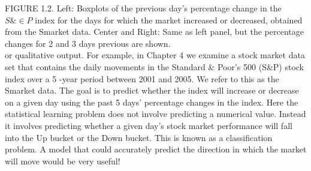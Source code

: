 \documentclass[10pt]{article}
\begin{document}
FIGURE 1.2. Left: Boxplots of the previous day's percentage change in the $S \& \in P$ index for the days for which the market increased or decreased, obtained from the Smarket data. Center and Right: Same as left panel, but the percentage changes for 2 and 3 days previous are shown.\\
or qualitative output. For example, in Chapter 4 we examine a stock market data set that contains the daily movements in the Standard \& Poor's 500 (S\&P) stock index over a 5 -year period between 2001 and 2005. We refer to this as the Smarket data. The goal is to predict whether the index will increase or decrease on a given day using the past 5 days' percentage changes in the index. Here the statistical learning problem does not involve predicting a numerical value. Instead it involves predicting whether a given day's stock market performance will fall into the Up bucket or the Down bucket. This is known as a classification problem. A model that could accurately predict the direction in which the market will move would be very useful!
\end{document}
